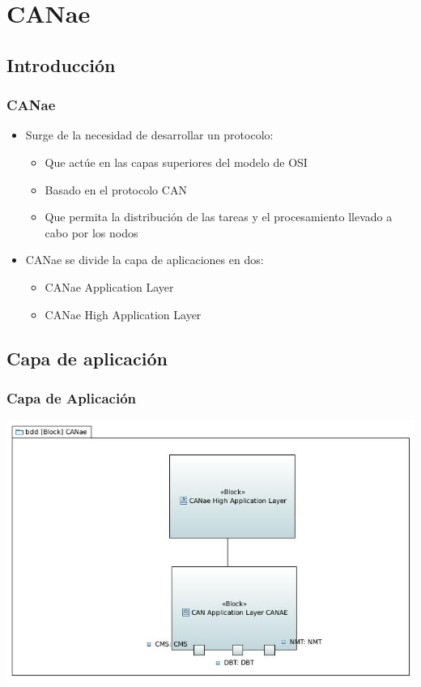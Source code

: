 \section{CANae}
\subsection{Introducción}
\begin{frame}
	\frametitle{CANae}
	\begin{itemize}
		\item Surge de la necesidad de desarrollar un protocolo:
		\begin{itemize}
			\item Que actúe en las capas superiores del modelo de OSI
			\item Basado en el protocolo CAN
			\item Que permita la distribución de las tareas y el procesamiento llevado a cabo por los nodos
		\end{itemize}
		\item CANae se divide la capa de aplicaciones en dos:
		\begin{itemize}
			\item CANae Application Layer
			\item CANae High Application Layer
		\end{itemize}
	\end{itemize}
\end{frame}

\subsection{Capa de aplicación}
\begin{frame}
	\frametitle{Capa de Aplicación}
	\centering
	\includegraphics[scale=0.4]{images/CANAE.JPG}
\end{frame}


